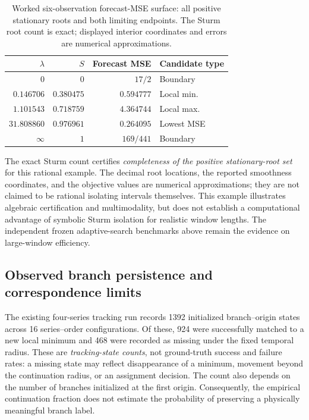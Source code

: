 \documentclass[english]{smcca}
\begin{document}
\begin{table}[t]
\centering
\caption{Worked six-observation forecast-MSE surface:
all positive stationary roots and both limiting endpoints.
The Sturm root count is exact; displayed interior
coordinates and errors are numerical approximations.}
\label{tab:sturm_example}
\begin{tabular}{@{}rrrl@{}}
\toprule
$\lambda$ & $S$ & Forecast MSE & Candidate type\\
\midrule
$0$ & $0$ & $17/2$ & Boundary\\
$0.146706$ & $0.380475$ & $0.594777$ & Local min.\\
$1.101543$ & $0.718759$ & $4.364744$ & Local max.\\
$31.808860$ & $0.976961$ & $\mathbf{0.264095}$ & Lowest MSE\\
$\infty$ & $1$ & $169/441$ & Boundary\\
\bottomrule
\end{tabular}
\end{table} The exact Sturm count certifies
\emph{completeness of the positive stationary-root set}
for this rational example. The decimal root locations,
the reported smoothness coordinates, and the objective
values are numerical approximations; they are not
claimed to be rational isolating intervals themselves.
This example illustrates algebraic certification and
multimodality, but does not establish a computational
advantage of symbolic Sturm isolation for realistic
window lengths. The independent frozen adaptive-search
benchmarks above remain the evidence on large-window
efficiency.

\subsection{Observed branch persistence and correspondence limits}
\label{sec:tracking_results}

The existing four-series tracking run records 1392 initialized
branch--origin states across 16 series--order configurations. Of these,
924 were successfully matched to a new local minimum and 468 were
recorded as missing under the fixed temporal radius. These are
\emph{tracking-state counts}, not ground-truth success and failure rates:
a missing state may reflect disappearance of a minimum, movement beyond
the continuation radius, or an assignment decision. The count also
depends on the number of branches initialized at the first origin.
Consequently, the empirical continuation fraction does not estimate
the probability of preserving a physically meaningful branch label.
\end{document}
